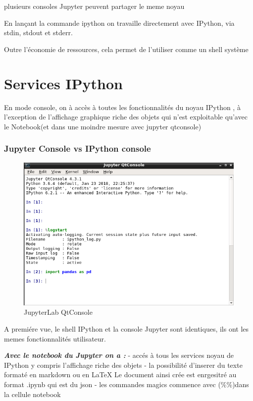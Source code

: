 \documentclass[11pt]{article}
\makeatletter
\def\maxwidth{\ifdim\Gin@nat@width>\linewidth\linewidth
    \else\Gin@nat@width\fi}
\let\Oldincludegraphics\includegraphics
\renewcommand{\includegraphics}[1]{\Oldincludegraphics[width=.8\maxwidth]{#1}}
\makeatother
\begin{document}
plusieurs consoles Jupyter peuvent partager le meme noyau

    En lançant la commande ipython on travaille directement avec IPython,
via stdin, stdout et stderr.

Outre l'économie de ressources, cela permet de l'utiliser comme un shell
système

    \section{Services IPython}\label{services-ipython}

En mode console, on à accès à toutes les fonctionnalités du noyau
IPython , à l'exception de l'affichage graphique riche des objets qui
n'est exploitable qu'avec le Notebook(et dans une moindre mesure avec
jupyter qtconsole)

    \subsubsection{Jupyter Console vs IPython
console}\label{jupyter-console-vs-ipython-console}

\begin{figure}
\centering
\includegraphics{images/jupyterqtconsole.png}
\caption{JupyterLab QtConsole}
\end{figure}

A premiére vue, le shell IPython et la console Jupyter sont identiques,
ils ont les memes fonctionnalités utilisateur.

    \textbf{\emph{Avec le notebook du Jupyter on a :}} - accés à tous les
services noyau de IPython y compris l'affichage riche des objets - la
possibilité d'inserer du texte formaté en markdown ou en LaTeX Le
document ainsi crée est enrgesitré au format .ipynb qui est du json -
les commandes magics commence avec (\%\%)dans la cellule notebook
\end{document}
